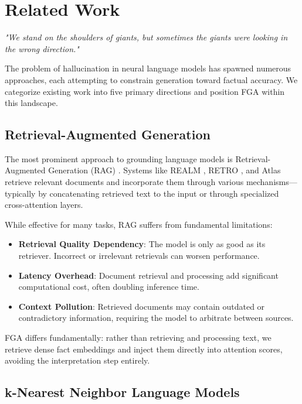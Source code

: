 \documentclass[11pt, a4paper]{article}
\theoremstyle{definition}
\begin{document}
\section{Related Work}

\textit{"We stand on the shoulders of giants, but sometimes the giants were looking in the wrong direction."}

The problem of hallucination in neural language models has spawned numerous approaches, each attempting to constrain generation toward factual accuracy. We categorize existing work into five primary directions and position FGA within this landscape.

\subsection{Retrieval-Augmented Generation}

The most prominent approach to grounding language models is Retrieval-Augmented Generation (RAG) \cite{lewis2020retrieval}. Systems like REALM \cite{guu2020retrieval}, RETRO \cite{borgeaud2022improving}, and Atlas \cite{izacard2022atlas} retrieve relevant documents and incorporate them through various mechanisms—typically by concatenating retrieved text to the input or through specialized cross-attention layers.

While effective for many tasks, RAG suffers from fundamental limitations:
\begin{itemize}
    \item \textbf{Retrieval Quality Dependency}: The model is only as good as its retriever. Incorrect or irrelevant retrievals can worsen performance.
    \item \textbf{Latency Overhead}: Document retrieval and processing add significant computational cost, often doubling inference time.
    \item \textbf{Context Pollution}: Retrieved documents may contain outdated or contradictory information, requiring the model to arbitrate between sources.
\end{itemize}

FGA differs fundamentally: rather than retrieving and processing text, we retrieve dense fact embeddings and inject them directly into attention scores, avoiding the interpretation step entirely.

\subsection{k-Nearest Neighbor Language Models}
\end{document}
